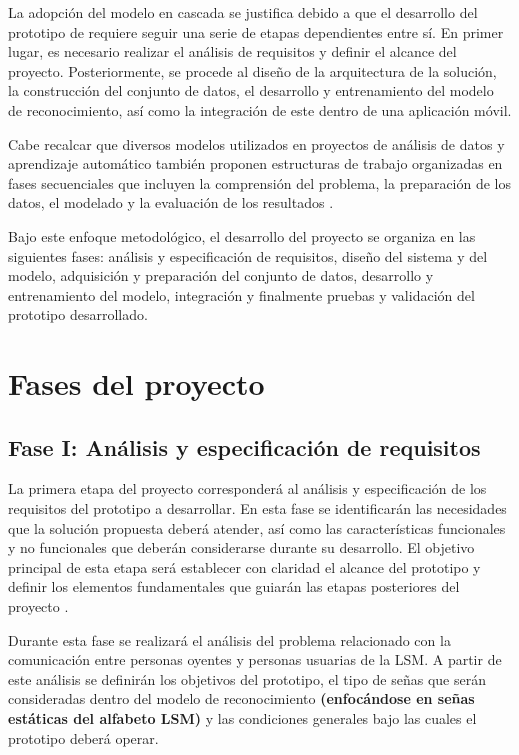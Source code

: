 	La adopción del modelo en
	cascada se justifica debido a que el desarrollo del prototipo de  requiere seguir una serie de etapas dependientes entre sí. En primer
	lugar, es necesario realizar el análisis de requisitos y definir el alcance del
	proyecto. Posteriormente, se procede al diseño de la arquitectura de la solución,
	la construcción del conjunto de datos, el desarrollo y entrenamiento del modelo
	de reconocimiento, así como la integración de este dentro de una aplicación móvil.
	
	Cabe recalcar que diversos modelos utilizados en proyectos
	de análisis de datos y aprendizaje automático también proponen estructuras de
	trabajo organizadas en fases secuenciales que incluyen la comprensión del
	problema, la preparación de los datos, el modelado y la evaluación de los
	resultados \cite{crispdm2000}. 
	
	Bajo este enfoque metodológico, el desarrollo del proyecto se organiza en las
	siguientes fases: análisis y especificación de requisitos, diseño del sistema
	y del modelo, adquisición y preparación del conjunto de datos, desarrollo y
	entrenamiento del modelo, integración y finalmente pruebas y
	validación del prototipo desarrollado.
	
	\section{Fases del proyecto}
	
	\subsection{Fase I: Análisis y especificación de requisitos}
	
	La primera etapa del proyecto corresponderá al análisis y especificación de los
	requisitos del prototipo a desarrollar. En esta fase se identificarán las
	necesidades que la solución propuesta deberá atender, así como las
	características funcionales y no funcionales que deberán considerarse durante
	su desarrollo. El objetivo principal de esta etapa será establecer con claridad
	el alcance del prototipo y definir los elementos fundamentales que guiarán las
	etapas posteriores del proyecto \cite{pressman2014,sommerville2016}.
	
	Durante esta fase se realizará el análisis del problema relacionado con la
	comunicación entre personas oyentes y personas usuarias de la LSM. A partir de este análisis se definirán los objetivos del
	prototipo, el tipo de señas que serán consideradas dentro del modelo de
	reconocimiento \textbf{(enfocándose en señas estáticas del alfabeto LSM)} y las condiciones generales bajo las cuales el prototipo deberá
	operar.
	
